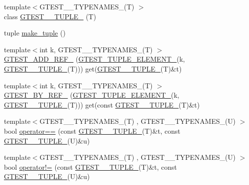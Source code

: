 \begin{DoxyCompactItemize}
\item 
{\footnotesize template$<$\-G\-T\-E\-S\-T\-\_\-\_\-\-T\-Y\-P\-E\-N\-A\-M\-E\-S\-\_\-(\-T) $>$ }\\class \hyperlink{namespacestd_1_1tr1_af4a00d1accea9dabe605c9895f33a0a3}{\-G\-T\-E\-S\-T\-\_\-\_\-\-T\-U\-P\-L\-E\-\_\-} (\-T)
\item 
tuple \hyperlink{namespacestd_1_1tr1_a21692ee06c36147458c1f75e7c8a1296}{make\-\_\-tuple} ()
\item 
{\footnotesize template$<$int k, \-G\-T\-E\-S\-T\-\_\-\_\-\-T\-Y\-P\-E\-N\-A\-M\-E\-S\-\_\-(\-T) $>$ }\\\hyperlink{namespacestd_1_1tr1_aae60f16ee244270a28a0374fed590548}{\-G\-T\-E\-S\-T\-\_\-\-A\-D\-D\-\_\-\-R\-E\-F\-\_\-} (\hyperlink{gtest-tuple_8h_a1b7f133d8aa02e0b7afed7b66781eeb7}{\-G\-T\-E\-S\-T\-\_\-\-T\-U\-P\-L\-E\-\_\-\-E\-L\-E\-M\-E\-N\-T\-\_\-}(k, \hyperlink{gtest-tuple_8h_a275e7bcd84299cc44b9c1dba971951c4}{\-G\-T\-E\-S\-T\-\_\-\_\-\-T\-U\-P\-L\-E\-\_\-}(\-T))) get(\hyperlink{gtest-tuple_8h_a275e7bcd84299cc44b9c1dba971951c4}{\-G\-T\-E\-S\-T\-\_\-\_\-\-T\-U\-P\-L\-E\-\_\-}(\-T)\&t)
\item 
{\footnotesize template$<$int k, \-G\-T\-E\-S\-T\-\_\-\_\-\-T\-Y\-P\-E\-N\-A\-M\-E\-S\-\_\-(\-T) $>$ }\\\hyperlink{namespacestd_1_1tr1_a70eef1687deb32579a7162328afc3778}{\-G\-T\-E\-S\-T\-\_\-\-B\-Y\-\_\-\-R\-E\-F\-\_\-} (\hyperlink{gtest-tuple_8h_a1b7f133d8aa02e0b7afed7b66781eeb7}{\-G\-T\-E\-S\-T\-\_\-\-T\-U\-P\-L\-E\-\_\-\-E\-L\-E\-M\-E\-N\-T\-\_\-}(k, \hyperlink{gtest-tuple_8h_a275e7bcd84299cc44b9c1dba971951c4}{\-G\-T\-E\-S\-T\-\_\-\_\-\-T\-U\-P\-L\-E\-\_\-}(\-T))) get(const \hyperlink{gtest-tuple_8h_a275e7bcd84299cc44b9c1dba971951c4}{\-G\-T\-E\-S\-T\-\_\-\_\-\-T\-U\-P\-L\-E\-\_\-}(\-T)\&t)
\item 
{\footnotesize template$<$\-G\-T\-E\-S\-T\-\_\-\_\-\-T\-Y\-P\-E\-N\-A\-M\-E\-S\-\_\-(\-T) , \-G\-T\-E\-S\-T\-\_\-\_\-\-T\-Y\-P\-E\-N\-A\-M\-E\-S\-\_\-(\-U) $>$ }\\bool \hyperlink{namespacestd_1_1tr1_acd4cf6107e05913b8a70108a023952b9}{operator==} (const \hyperlink{gtest-tuple_8h_a275e7bcd84299cc44b9c1dba971951c4}{\-G\-T\-E\-S\-T\-\_\-\_\-\-T\-U\-P\-L\-E\-\_\-}(\-T)\&t, const \hyperlink{gtest-tuple_8h_a275e7bcd84299cc44b9c1dba971951c4}{\-G\-T\-E\-S\-T\-\_\-\_\-\-T\-U\-P\-L\-E\-\_\-}(\-U)\&u)
\item 
{\footnotesize template$<$\-G\-T\-E\-S\-T\-\_\-\_\-\-T\-Y\-P\-E\-N\-A\-M\-E\-S\-\_\-(\-T) , \-G\-T\-E\-S\-T\-\_\-\_\-\-T\-Y\-P\-E\-N\-A\-M\-E\-S\-\_\-(\-U) $>$ }\\bool \hyperlink{namespacestd_1_1tr1_a2e9a8c3a0e08cfe0122e92ef8d77216e}{operator!=} (const \hyperlink{gtest-tuple_8h_a275e7bcd84299cc44b9c1dba971951c4}{\-G\-T\-E\-S\-T\-\_\-\_\-\-T\-U\-P\-L\-E\-\_\-}(\-T)\&t, const \hyperlink{gtest-tuple_8h_a275e7bcd84299cc44b9c1dba971951c4}{\-G\-T\-E\-S\-T\-\_\-\_\-\-T\-U\-P\-L\-E\-\_\-}(\-U)\&u)

\end{DoxyCompactItemize}

